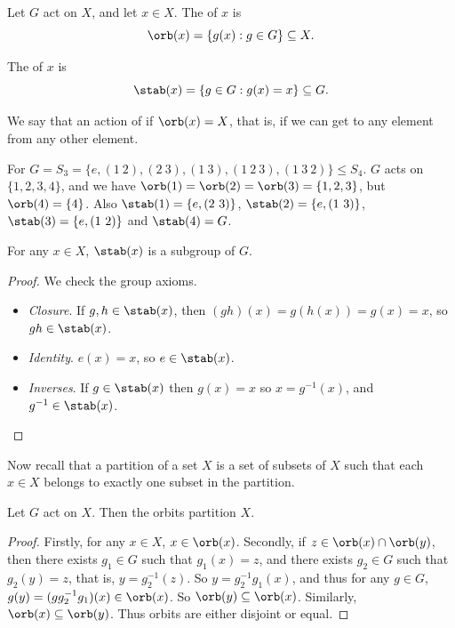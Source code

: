\begin{definition}[Orbit]
Let $G$ act on $X$, and let $x \in X$. The  of $x$ is
$$
	\orb(x) = \{ g(x) : g \in G \} \subseteq X.
$$
\end{definition}

\begin{definition}[Stabilizer]
The  of $x$ is
$$
\stab(x) = \{ g \in G : g(x) = x \} \subseteq G.
$$
\end{definition}

We say that an action of  if $\orb(x) = X$, that is, if we can get to any element from any other element.

\begin{example}
	For $G = S_3 = \{e, (1\ 2), (2\ 3), (1\ 3), (1\ 2\ 3), (1\ 3\ 2)\} \leq S_4$. $G$ acts on $\{1, 2, 3, 4\}$, and we have $\orb(1) = \orb(2) = \orb(3) =\{1, 2, 3\}$, but $\orb(4) = \{4\}$. Also $\stab(1) = \{e, (2\ 3)\}$, $\stab(2) = \{ e, (1\ 3)\}$, $\stab(3) = \{ e, (1\ 2)\}$ and $\stab(4) = G$.
\end{example}

\begin{lemma}
	For any $x \in X$, $\stab(x)$ is a subgroup of $G$.
\end{lemma}
\begin{proof}
	We check the group axioms.
	\begin{itemize}
		\item \emph{Closure}. If $g, h \in \stab(x)$, then $(gh)(x) = g(h(x)) = g(x) = x$, so $gh \in \stab(x)$.
		\item \emph{Identity}. $e(x) = x$, so $e \in \stab(x)$.
		\item \emph{Inverses}. If $g \in \stab(x)$ then $g(x) = x$ so $x = g^{-1}(x)$, and $g^{-1} \in \stab(x)$.
	\end{itemize}
\end{proof}

Now recall that a partition of a set $X$ is a set of subsets of $X$ such that each $x \in X$ belongs to exactly one subset in the partition.

\begin{lemma}
	Let $G$ act on $X$. Then the orbits partition $X$.
\end{lemma}
\begin{proof}
	Firstly, for any $x \in X$, $x \in \orb(x)$. Secondly, if $z \in \orb(x) \cap \orb(y)$, then there exists $g_1 \in G$ such that $g_1(x) = z$, and there exists $g_2 \in G$ such that $g_2 (y) = z$, that is, $y = g_2^{-1}(z)$. So $y = g_2^{-1} g_1 (x)$, and thus for any $g \in G$, $g(y) = (g g_2^{-1} g_1)(x) \in \orb(x)$. So $\orb(y) \subseteq \orb(x)$. Similarly, $\orb(x) \subseteq \orb(y)$. Thus orbits are either disjoint or equal.
\end{proof}


